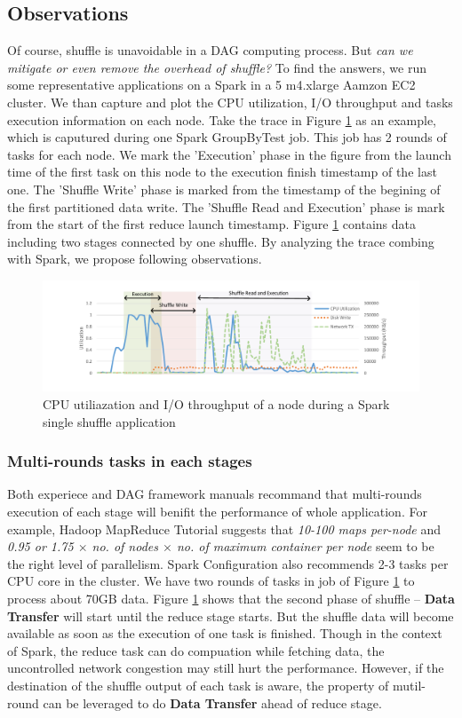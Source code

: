 \documentclass[10pt,twocolumn]{article}
\begin{document}
\subsection{Observations} \label{observation}
Of course, shuffle is unavoidable in a DAG computing process. But \textit{can we mitigate or even remove the overhead of shuffle?} To find the answers, we run some representative applications on a Spark in a 5 m4.xlarge Aamzon EC2 cluster. We than capture and plot the CPU utilization, I/O throughput and tasks execution information on each node. Take the trace in Figure \ref{fig:util} as an example, which is caputured during one Spark GroupByTest job. This job has 2 rounds of tasks for each node. We mark the 'Execution' phase in the figure from the launch time of the first task on this node to the execution finish timestamp of the last one. The 'Shuffle Write' phase is marked from the timestamp of the begining of the first partitioned data write. The 'Shuffle Read and Execution' phase is mark from the start of the first reduce launch timestamp.
Figure \ref{fig:util} contains data including two stages connected by one shuffle. By analyzing the trace combing with Spark, we propose following observations.
\begin{figure}
	\includegraphics[width=\textwidth]{fig/util}
	\caption{CPU utiliazation and I/O throughput of a node during a Spark single shuffle application}
	\label{fig:util}
\end{figure}

\subsubsection{Multi-rounds tasks in each stages}\label{multi}
Both experiece and DAG framework manuals recommand that multi-rounds execution of each stage will benifit the performance of whole application.
For example, Hadoop MapReduce Tutorial \cite{hadooptutorial} suggests that \textit{10-100 maps per-node} and \textit{0.95 or 1.75 $\times$ no. of nodes $\times$ no. of maximum container per node} seem to be the right level of parallelism. Spark Configuration also recommends 2-3 tasks per CPU core in the cluster\cite{sparkconf}.
We have two rounds of tasks in job of Figure \ref{fig:util} to process about 70GB data. Figure \ref{fig:util} shows that the second phase of shuffle -- \textbf{Data Transfer} will start until the reduce stage starts.
But the shuffle data will become available as soon as the execution of one task is finished. Though in the context of Spark, the reduce task can do compuation while fetching data, the uncontrolled network congestion may still hurt the performance. However, if the destination of the shuffle output of each task is aware, the property of mutil-round can be leveraged to do \textbf{Data Transfer} ahead of reduce stage.
\end{document}
